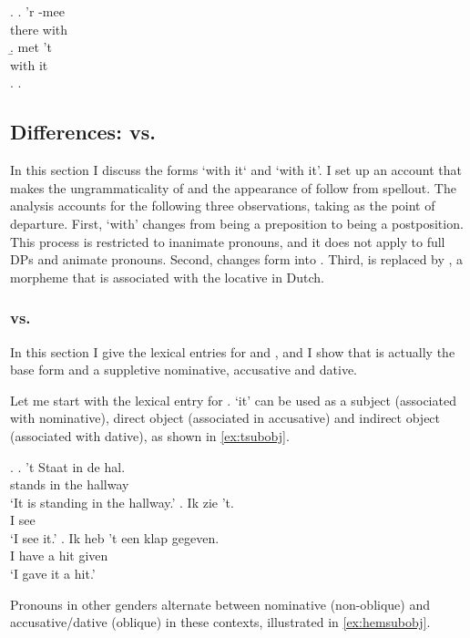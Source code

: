 \documentclass[12pt]{article}
\begin{document}
\ex.
\ag. 'r -mee\\
there with\\
\b. met 't\\
with it\\
\z.
\z.


\subsection{Differences:  vs. }

In this section I discuss the forms  `with it` and  `with it'. I set up an account that makes the ungrammaticality of  and the appearance of  follow from spellout. The analysis accounts for the following three observations, taking  as the point of departure. First,  `with' changes from being a preposition to being a postposition. This process is restricted to inanimate pronouns, and it does not apply to full DPs and animate pronouns. Second,  changes form into . Third,  is replaced by , a morpheme that is associated with the locative in Dutch.

\subsubsection{ vs. }

In this section I give the lexical entries for  and , and I show that  is actually the base form and  a suppletive nominative, accusative and dative.

Let me start with the lexical entry for .  `it' can be used as a subject (associated with nominative), direct object (associated in accusative) and indirect object (associated with dative), as shown in \ref{ex:tsubobj}.

\ex.\label{ex:tsubobj}
\ag. 't Staat in de hal.\\
  stands in the hallway\\
 `It is standing in the hallway.'\label{ex:tnoclitic}
\bg. Ik zie 't.\\
 I see \\
 `I see it.'
\bg. Ik heb 't een klap gegeven.\\
 I have  a hit given\\
 `I gave it a hit.'

 Pronouns in other genders alternate between nominative (non-oblique) and accusative/dative (oblique) in these contexts, illustrated in \ref{ex:hemsubobj}.
\end{document}
